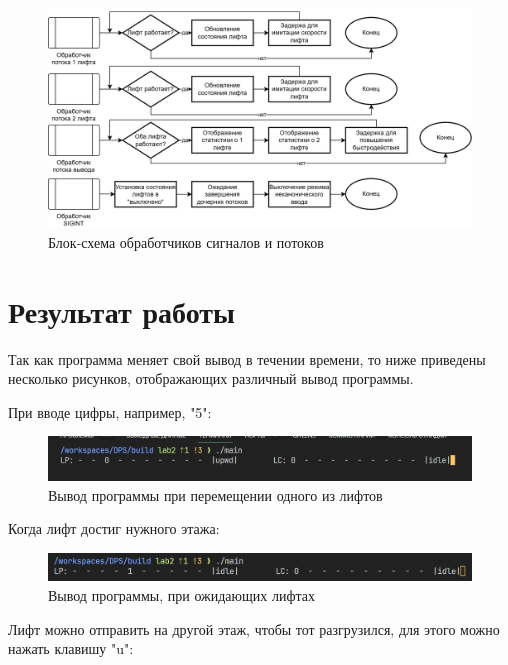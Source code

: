 \begin{figure}[H]
    \centering
    \includegraphics[width=0.9\linewidth]{images/lab2_handlers_scheme.drawio.png}
    \caption{Блок-схема обработчиков сигналов и потоков}
    \label{fig:handlers_flowchart}
\end{figure}

\newpage

\section*{Результат работы}

Так как программа меняет свой вывод в течении времени, то ниже приведены
несколько рисунков, отображающих различный вывод программы.

При вводе цифры, например, "5":

\begin{figure}[H]
    \centering
    \includegraphics[width=0.8\linewidth]{images/lab2_output1.png}
    \caption{Вывод программы при перемещении одного из лифтов}
    \label{fig:output1}
\end{figure}

Когда лифт достиг нужного этажа:

\begin{figure}[H]
    \centering
    \includegraphics[width=0.8\linewidth]{images/lab2_output2.png}
    \caption{Вывод программы, при ожидающих лифтах}
    \label{fig:output2}
\end{figure}

Лифт можно отправить на другой этаж, чтобы тот разгрузился, для этого можно
нажать клавишу "u":

